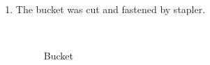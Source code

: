 \begin{enumerate}
\begin{enumerate}
\begin{figure}[H]
		 		         \end{figure}
		\item The bucket was cut and fastened by stapler.
		 		         \begin{figure}[H]
		 		         	\begin{minipage}[h]{0.2\linewidth}
		 		         		\center  
		 		         	\end{minipage}
		 		         	\begin{minipage}[h]{0.6\linewidth}
		 		         		\caption{Bucket}
		 		         	\end{minipage}

\end{figure}
\end{enumerate}
\end{enumerate}
